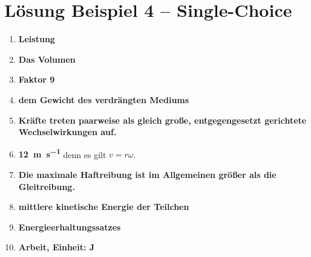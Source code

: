 \documentclass[11pt, a4paper]{article}
\begin{document}
\newpage

\section*{Lösung Beispiel 4 -- Single-Choice}
\begin{enumerate}
    \item \textbf{Leistung}
    \item \textbf{Das Volumen}
    \item \textbf{Faktor 9}
    \item \textbf{dem Gewicht des verdrängten Mediums}
    \item \textbf{Kräfte treten paarweise als gleich große, entgegengesetzt gerichtete Wechselwirkungen auf.}
    \item \textbf{\SI{12}{\metre\per\second}} \quad denn es gilt $v = r\omega$.
    \item \textbf{Die maximale Haftreibung ist im Allgemeinen größer als die Gleitreibung.}
    \item \textbf{mittlere kinetische Energie der Teilchen}
    \item \textbf{Energieerhaltungssatzes}
    \item \textbf{Arbeit, Einheit: \si{\joule}}
\end{enumerate}
\end{document}
